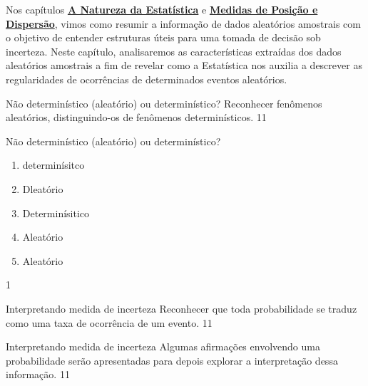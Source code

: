 Nos capítulos \hyperref[est1-chap]{\textbf{A Natureza da Estatística}} e \hyperref[est2-chap]{\textbf{Medidas de Posição e Dispersão}}, vimos como resumir a informação de dados aleatórios amostrais com o objetivo de  entender estruturas úteis para uma tomada de decisão sob incerteza. Neste capítulo, analisaremos as características extraídas dos dados aleatórios amostrais a fim de revelar como a Estatística nos auxilia a descrever as regularidades de ocorrências de determinados eventos aleatórios.
\clearpage
\begin{objectives}{Não determinístico (aleatório) ou determinístico?}
{
Reconhecer fenômenos aleatórios, distinguindo-os de fenômenos determinísticos.
}{1}{1}
\end{objectives}

\begin{answer}{Não determinístico (aleatório) ou determinístico?}
{
\begin{enumerate}
\item determinísitco
\item Dleatório
\item Determinísitico
\item Aleatório
\item Aleatório
\end{enumerate}
}{1}
\end{answer}
\begin{objectives}{Interpretando medida de incerteza}
{
Reconhecer que toda probabilidade se traduz como uma taxa de ocorrência de um evento.
}{1}{1}
\end{objectives}
\begin{sugestions}{Interpretando medida de incerteza}
{
Algumas afirmações envolvendo uma probabilidade serão apresentadas para depois explorar a interpretação dessa informação.
}{1}{1}
\end{sugestions}
